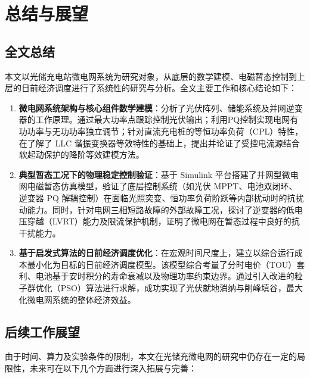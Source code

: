 \section{总结与展望}
\label{sec:conclusion}

\subsection{全文总结}
本文以光储充电站微电网系统为研究对象，从底层的数学建模、电磁暂态控制到上层的日前经济调度进行了系统性的研究与分析。全文主要工作和核心结论如下：

\begin{enumerate}
    \item \textbf{微电网系统架构与核心组件数学建模}：分析了光伏阵列、储能系统及并网逆变器的工作原理。通过最大功率点跟踪控制光伏输出；利用PQ控制实现电网有功功率与无功功率独立调节；针对直流充电桩的等恒功率负荷（CPL）特性，在了解了 LLC 谐振变换器等效特性的基础上，提出并论证了受控电流源结合软起动保护的降阶等效建模方法。
    \item \textbf{典型暂态工况下的物理稳定控制验证}：基于 Simulink 平台搭建了并网型微电网电磁暂态仿真模型，验证了底层控制系统（如光伏 MPPT、电池双闭环、逆变器 PQ 解耦控制）在面临光照突变、恒功率负荷阶跃等内部扰动时的抗扰动能力。同时，针对电网三相短路故障的外部故障工况，探讨了逆变器的低电压穿越（LVRT）能力及限流保护机制，证明了微电网在暂态过程中良好的抗干扰能力。
    \item \textbf{基于启发式算法的日前经济调度优化}：在宏观时间尺度上，建立以综合运行成本最小化为目标的日前经济调度模型。该模型综合考量了分时电价（TOU）套利、电池基于安时积分的寿命衰减以及物理功率约束边界。通过引入改进的粒子群优化（PSO）算法进行求解，成功实现了光伏就地消纳与削峰填谷，最大化微电网系统的整体经济效益。
\end{enumerate}

\subsection{后续工作展望}
由于时间、算力及实验条件的限制，本文在光储充微电网的研究中仍存在一定的局限性，未来可在以下几个方面进行深入拓展与完善：

